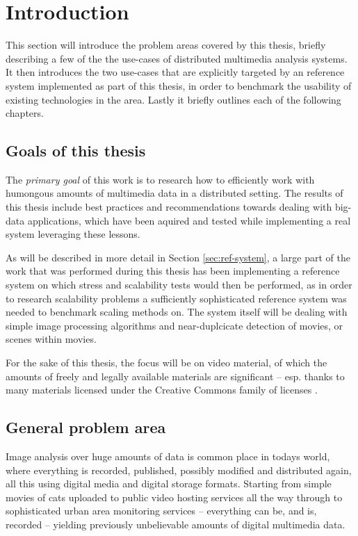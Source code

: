 \chapter{Introduction}
\label{cha:intro}

This section will introduce the problem areas covered by this thesis, briefly describing a few of the the use-cases of distributed multimedia analysis systems. It then introduces the two use-cases that are explicitly targeted by an reference system implemented as part of this thesis, in order to benchmark the usability of existing technologies in the area. Lastly it briefly outlines each of the following chapters.


\section{Goals of this thesis}
The \textit{primary goal} of this work is to research how to efficiently work with humongous amounts of multimedia data in a distributed setting. The results of this thesis include best practices and recommendations towards dealing with big-data applications, which have been aquired and tested while implementing a real system leveraging these lessons. 

As will be described in more detail in Section \ref{sec:ref-system}, a large part of the work that was performed during this thesis has been implementing a reference system on which stress and scalability tests would then be performed, as in order to research scalability problems a sufficiently sophisticated reference system was needed to benchmark scaling methods on. The system itself will be dealing with simple image processing algorithms and near-duplcicate detection of movies, or scenes within movies.

For the sake of this thesis, the focus will be on video material, of which the amounts of freely and legally  available materials are significant -- esp. thanks to many materials licensed under the Creative Commons family of licenses \cite{creative-commons}.


\section{General problem area}
Image analysis over huge amounts of data is common place in todays world, where everything is recorded, published, possibly modified and distributed again, all this using digital media and digital storage formats. Starting from simple movies of cats uploaded to public video hosting services all the way through to sophisticated urban area monitoring services -- everything can be, and is, recorded -- yielding previously unbelievable amounts of digital multimedia data.

